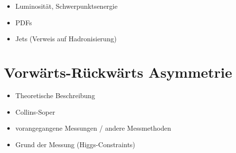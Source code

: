 \begin{itemize}
    \item Luminosität, Schwerpunktsenergie
    \item PDFs
    \item Jets (Verweis auf Hadronisierung)
\end{itemize}



\section{Vorwärts-Rückwärts Asymmetrie}
\label{theory:afb}

\begin{itemize}
    \item Theoretische Beschreibung
    \item Collins-Soper
    \item vorangegangene Messungen / andere Messmethoden
    \item Grund der Messung (Higgs-Constraints)
\end{itemize}



